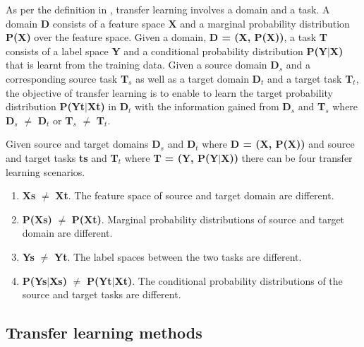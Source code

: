 \documentclass[a4paper, 12pt, oneside, BCOR1cm,toc=chapterentrywithdots]{scrbook}
\begin{document}
As per the definition in \cite{pan2010survey}, transfer learning involves a domain and a task. A domain \textbf{D} consists of a feature space \textbf{X} and a marginal probability distribution \textbf{P(X)} over the feature space. Given a domain, \textbf{D = (X, P(X))}, a task \textbf{T} consists of a label space \textbf{Y} and a conditional probability distribution \textbf{P(Y$\vert$X)} that is learnt from the training data. Given a source domain \textbf{D$_{s}$} and a corresponding source task \textbf{T$_{s}$} as well as a target domain \textbf{D$_{t}$} and a target task \textbf{T$_{t}$}, the objective of transfer learning is to enable to learn the target probability distribution \textbf{P(Yt$\vert$Xt)} in \textbf{D$_{t}$} with the information gained from \textbf{D$_{s}$} and \textbf{T$_{s}$} where  \textbf{D$_{s}$} $\neq$ \textbf{D$_{t}$} or \textbf{T$_{s}$} $\neq$ \textbf{T$_{t}$}. 

Given source and target domains \textbf{D$_{s}$} and \textbf{D$_{t}$} where \textbf{D = (X, P(X))} and source and target tasks \textbf{ts} and \textbf{T$_{t}$} where \textbf{T = (Y, P(Y$\vert$X))} there can be four transfer learning scenarios.

\begin{enumerate}
	\item \textbf{Xs} $\neq$ \textbf{Xt}. The feature space of source and target domain are different. 
	\item \textbf{P(Xs)} $\neq$ \textbf{P(Xt)}. Marginal probability distributions of source and target domain are different.
	\item \textbf{Ys} $\neq$ \textbf{Yt}. The label spaces between the two tasks are different.
	\item \textbf{P(Ys$\vert$Xs)} $\neq$ \textbf{P(Yt$\vert$Xt)}. The  conditional probability distributions of the source and target tasks are different.
\end{enumerate}

\subsection{Transfer learning methods}
\end{document}
